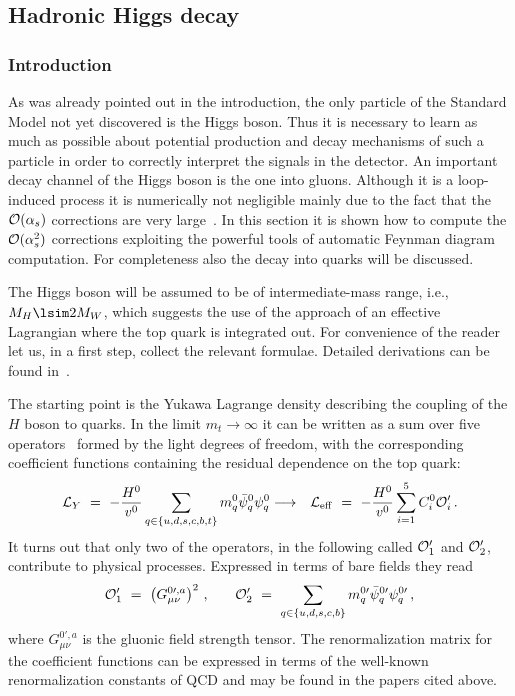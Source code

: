 
\subsection{Hadronic Higgs decay\label{sec:applic:hgg}}
%
%

\subsubsection{Introduction}
%
As was already pointed out in the introduction, the only particle of the
Standard Model not yet discovered is the Higgs boson.  Thus it is
necessary to learn as much as possible about potential production and
decay mechanisms of such a particle in order to correctly interpret the
signals in the detector.  An important decay channel of the Higgs boson
is the one into gluons. Although it is a loop-induced process it is
numerically not negligible mainly due to the fact that the ${\cal
  O}(\alpha_s)$ corrections are very
large~\cite{InaKubOka83,DjoSpiZer91}. In this section it is
shown how to compute the ${\cal O}(\alpha_s^2)$ corrections exploiting
the powerful tools of automatic Feynman diagram computation.  For
completeness also the decay into quarks will be discussed.

The Higgs boson will be assumed to be of intermediate-mass range, i.e.,
$M_H\lsim 2M_W$, which suggests the use of the approach of an effective
Lagrangian where the top quark is integrated out. For convenience
of the reader let us, in a first step, collect the relevant formulae.
Detailed derivations can be found
in~\cite{Klu75,Spi84,InaKubOka83,CheKniSte97hbb}.

The starting point is the Yukawa Lagrange density describing the
coupling of the $H$ boson to quarks.  In the limit $m_t\to\infty$ it can
be written as a sum over five operators~\cite{Klu75,Spi84} formed by the
light degrees of freedom, with the corresponding coefficient functions
containing the residual dependence on the top quark:
\begin{eqnarray}
{\cal L}_Y\,\,=\,\,-\frac{H^0}{v^0}
\sum_{q\in\{u,d,s,c,b,t\}}m_{q}^0\bar\psi_{q}^0\psi_{q}^0
&\longrightarrow&
{\cal L}_{\rm eff}\,\,=\,\,
-\frac{H^0}{v^0}\sum_{i=1}^5C_i^0{\cal O}_i^\prime
\,.
\label{eqlagr}
\end{eqnarray}
It turns out that only two of the operators, in the following called
${\cal O}_1^\prime$ and ${\cal O}_2^\prime$, contribute to physical processes.
Expressed in terms of bare fields they read
\begin{eqnarray}
{\cal O}^\prime_1
\,\,=\,\,
\left(G^{0\prime,a}_{\mu\nu}\right)^2\,,
&\quad&
{\cal O}^\prime_2
\,\,=\,\,
\sum_{q\in\{u,d,s,c,b\}}m_{q}^{0\prime}
  \bar\psi_{q}^{0\prime}\psi_{q}^{0\prime}
\,,
\end{eqnarray}
where $G^{0\prime,a}_{\mu\nu}$ is the gluonic field strength tensor.
The renormalization matrix for the coefficient functions 
can be expressed in terms of the well-known renormalization
constants of QCD and may be found in the papers cited above.

